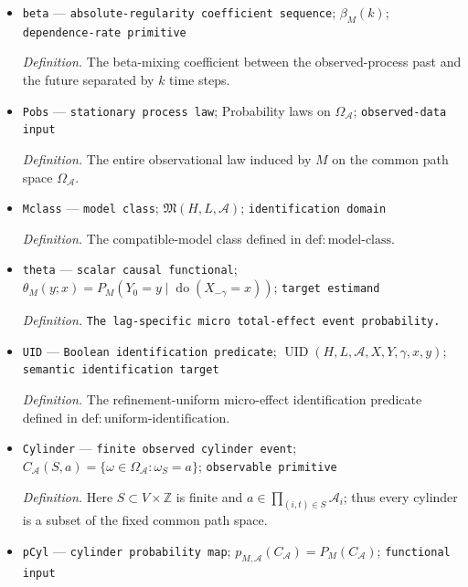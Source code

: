 \documentclass{article}
\begin{document}
\begin{itemize}
  \par\smallskip\noindent\emph{Definition.} A time-homogeneous causal model on a refinement \(R\), with observed variables taking values in the fixed family \(\mathcal A\) and pairwise shared exogenous roots for bidirected edges.
  \item \texttt{beta} --- \texttt{absolute-\allowbreak{}regularity coefficient sequence}; \(\beta_M(k)\); \texttt{dependence-\allowbreak{}rate primitive}
  \par\smallskip\noindent\emph{Definition.} The beta-mixing coefficient between the observed-process past and the future separated by \(k\) time steps.
  \item \texttt{Pobs} --- \texttt{stationary process law}; Probability laws on \(\Omega_{\mathcal A}\); \texttt{observed-\allowbreak{}data input}
  \par\smallskip\noindent\emph{Definition.} The entire observational law induced by \(M\) on the common path space \(\Omega_{\mathcal A}\).
  \item \texttt{Mclass} --- \texttt{model class}; \(\mathfrak M(H,L,\mathcal A)\); \texttt{identification domain}
  \par\smallskip\noindent\emph{Definition.} The compatible-model class defined in \(\mathrm{def:model\text{-}class}\).
  \item \texttt{theta} --- \texttt{scalar causal functional}; \(\theta_M(y;x)=P_M(Y_0=y\mid\operatorname{do}(X_{-\gamma}=x))\); \texttt{target estimand}
  \par\smallskip\noindent\emph{Definition.} \texttt{The lag-\allowbreak{}specific micro total-\allowbreak{}effect event probability.}
  \item \texttt{UID} --- \texttt{Boolean identification predicate}; \(\operatorname{UID}(H,L,\mathcal A,X,Y,\gamma,x,y)\); \texttt{semantic identification target}
  \par\smallskip\noindent\emph{Definition.} The refinement-uniform micro-effect identification predicate defined in \(\mathrm{def:uniform\text{-}identification}\).
  \item \texttt{Cylinder} --- \texttt{finite observed cylinder event}; \(C_{\mathcal A}(S,a)=\{\omega\in\Omega_{\mathcal A}:\omega_S=a\}\); \texttt{observable primitive}
  \par\smallskip\noindent\emph{Definition.} Here \(S\subset V\times\mathbb Z\) is finite and \(a\in\prod_{(i,t)\in S}\mathcal A_i\); thus every cylinder is a subset of the fixed common path space.
  \item \texttt{pCyl} --- \texttt{cylinder probability map}; \(p_{M,\mathcal A}(C_{\mathcal A})=P_M(C_{\mathcal A})\); \texttt{functional input}

\end{itemize}
\end{document}
